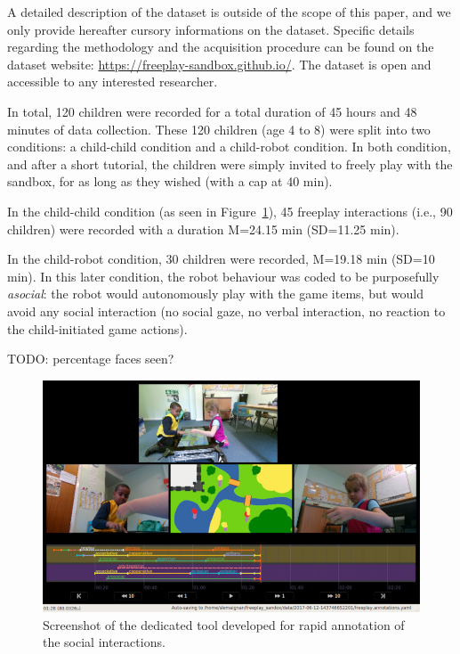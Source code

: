 \documentclass[sigconf]{acmart}
\newcommand{\ie}{i.e.,\xspace}
\begin{document}
A detailed description of the dataset is outside of the scope of this paper, and
we only provide hereafter cursory informations on the dataset. Specific details
regarding the methodology and the acquisition procedure can be found on the
dataset website: \url{https://freeplay-sandbox.github.io/}. The dataset is open and accessible
to any interested researcher.

In total, 120 children were recorded for a total duration of 45 hours and 48
minutes of data collection. These 120 children (age 4 to 8) were split into two
conditions: a child-child condition and a child-robot condition. In both
condition, and after a short tutorial, the children were simply invited to
freely play with the sandbox, for as long as they wished (with a cap at 40 min).

In the child-child condition (as seen in Figure~\ref{annotator}), 45 freeplay interactions (\ie 90 children) were
recorded with a duration M=24.15 min (SD=11.25 min).

In the child-robot condition, 30 children were recorded, M=19.18 min (SD=10
min). In this later condition, the robot
behaviour was coded to be purposefully \emph{asocial}: the robot would autonomously play with
the game items, but would avoid any social interaction (no social gaze, no
verbal interaction, no reaction to the child-initiated game actions).

TODO: percentage faces seen?

\begin{figure}
    \centering
    \includegraphics[width=\columnwidth]{annotator}
    \caption{Screenshot of the dedicated tool developed for rapid annotation of
    the social interactions.}
    \label{annotator}
\end{figure}
\end{document}
